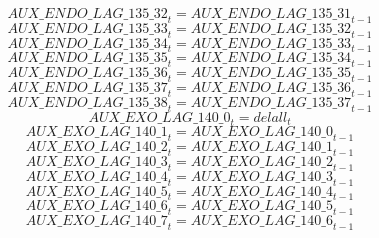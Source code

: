 \begin{dmath}
{AUX\_ENDO\_LAG\_135\_32}_{t}={AUX\_ENDO\_LAG\_135\_31}_{t-1}
\end{dmath}
\begin{dmath}
{AUX\_ENDO\_LAG\_135\_33}_{t}={AUX\_ENDO\_LAG\_135\_32}_{t-1}
\end{dmath}
\begin{dmath}
{AUX\_ENDO\_LAG\_135\_34}_{t}={AUX\_ENDO\_LAG\_135\_33}_{t-1}
\end{dmath}
\begin{dmath}
{AUX\_ENDO\_LAG\_135\_35}_{t}={AUX\_ENDO\_LAG\_135\_34}_{t-1}
\end{dmath}
\begin{dmath}
{AUX\_ENDO\_LAG\_135\_36}_{t}={AUX\_ENDO\_LAG\_135\_35}_{t-1}
\end{dmath}
\begin{dmath}
{AUX\_ENDO\_LAG\_135\_37}_{t}={AUX\_ENDO\_LAG\_135\_36}_{t-1}
\end{dmath}
\begin{dmath}
{AUX\_ENDO\_LAG\_135\_38}_{t}={AUX\_ENDO\_LAG\_135\_37}_{t-1}
\end{dmath}
\begin{dmath}
{AUX\_EXO\_LAG\_140\_0}_{t}={delall}_{t}
\end{dmath}
\begin{dmath}
{AUX\_EXO\_LAG\_140\_1}_{t}={AUX\_EXO\_LAG\_140\_0}_{t-1}
\end{dmath}
\begin{dmath}
{AUX\_EXO\_LAG\_140\_2}_{t}={AUX\_EXO\_LAG\_140\_1}_{t-1}
\end{dmath}
\begin{dmath}
{AUX\_EXO\_LAG\_140\_3}_{t}={AUX\_EXO\_LAG\_140\_2}_{t-1}
\end{dmath}
\begin{dmath}
{AUX\_EXO\_LAG\_140\_4}_{t}={AUX\_EXO\_LAG\_140\_3}_{t-1}
\end{dmath}
\begin{dmath}
{AUX\_EXO\_LAG\_140\_5}_{t}={AUX\_EXO\_LAG\_140\_4}_{t-1}
\end{dmath}
\begin{dmath}
{AUX\_EXO\_LAG\_140\_6}_{t}={AUX\_EXO\_LAG\_140\_5}_{t-1}
\end{dmath}
\begin{dmath}
{AUX\_EXO\_LAG\_140\_7}_{t}={AUX\_EXO\_LAG\_140\_6}_{t-1}
\end{dmath}
